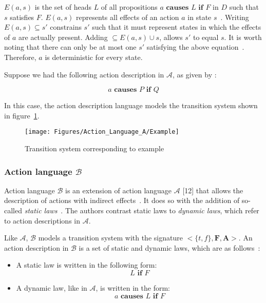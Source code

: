 $ E(a, s) $ is the set of heads $ L $ of all propositions $ a \textbf{ causes } L \textbf{ if } F $ in $ D $ such that $ s $ satisfies $ F $.
$ E(a, s) $ represents all effects of an action $ a $ in state $ s $~\citep{gelfond_action_1998}.
Writing $ E\left(a,s\right)\subseteq s' $ constrains $ s' $ such that it must represent states in which the effects of $ a $ are actually present.
Adding $ \subseteq E\left(a,s\right)\cup s $, allows $ s' $ to equal $ s $.
It is worth noting that there can only be at most one $ s' $ satisfying the above equation~\citep{gelfond_action_1998}.
Therefore, $ a $ is deterministic for every state.

Suppose we had the following action description in $\mathcal{A}$, as given by \citet{gelfond_action_1998}:

\[
a \textbf{ causes } P \textbf{ if } Q
\]

In this case, the action description language models the transition system shown in figure~\ref{fig:action_language_a_example}.

\begin{figure}[h]
    \centering
    \texttt{[image: Figures/Action\_Language\_A/Example]}
    \caption{Transition system corresponding to example}
    \label{fig:action_language_a_example}
\end{figure}

\subsubsection{Action language $ \mathcal{B} $}
\label{subsubsec:action_language_b}

Action language $ \mathcal{B} $ is an extension of action language $ \mathcal{A} $ [12] that allows the description of actions with indirect effects~\citep{gelfond_action_1998}.
It does so with the addition of so-called \textit{static laws}~\citep{gelfond_action_1998}.
The authors contrast static laws to \textit{dynamic laws}, which refer to action descriptions in $\mathcal{A}$.

Like $\mathcal{A}$, $\mathcal{B}$ models a transition system with the signature $<\{t, f\},\boldsymbol{F},\boldsymbol{A}>$.
An action description in $\mathcal{B}$ is a set of static and dynamic laws, which are as follows~\citep{gelfond_action_1998}:

\begin{itemize}
    \item A static law is written in the following form:
        \[
        L \textbf{ if } F
        \]

    \item A dynamic law, like in $\mathcal{A}$, is written in the form:
        \[
        a \textbf{ causes } L \textbf{ if } F
        \]
\end{itemize}

